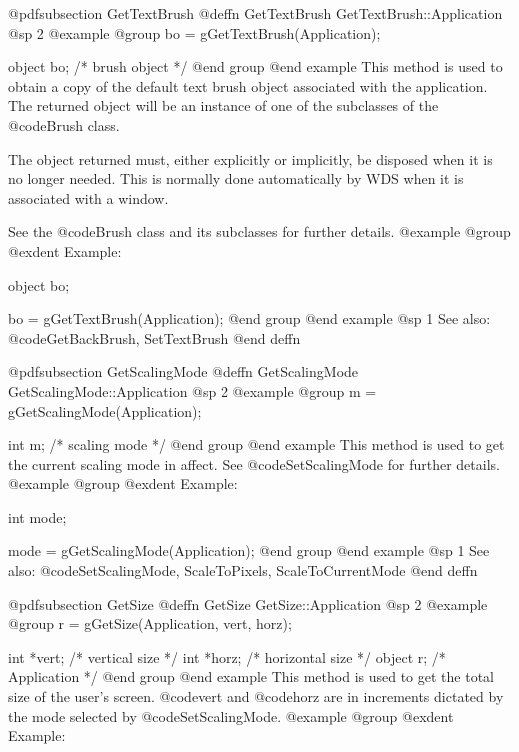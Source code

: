@pdfsubsection {GetTextBrush}
@deffn {GetTextBrush} GetTextBrush::Application
@sp 2
@example
@group
bo = gGetTextBrush(Application);

object  bo;     /*  brush object  */
@end group
@end example
This method is used to obtain a copy of the default text brush object
associated with the application.  The returned object will be an
instance of one of the subclasses of the @code{Brush} class.

The object returned must, either explicitly or implicitly, be
disposed when it is no longer needed.  This is normally done
automatically by WDS when it is associated with a window.

See the @code{Brush} class and its subclasses for further details.
@example
@group
@exdent Example:

object  bo;

bo = gGetTextBrush(Application);
@end group
@end example
@sp 1
See also:  @code{GetBackBrush, SetTextBrush}
@end deffn















@pdfsubsection {GetScalingMode}
@deffn {GetScalingMode} GetScalingMode::Application
@sp 2
@example
@group
m = gGetScalingMode(Application);

int     m;      /*  scaling mode   */
@end group
@end example
This method is used to get the current scaling mode in affect.
See @code{SetScalingMode} for further details.
@example
@group
@exdent Example:

int     mode;

mode = gGetScalingMode(Application);
@end group
@end example
@sp 1
See also:  @code{SetScalingMode, ScaleToPixels, ScaleToCurrentMode}
@end deffn
















@pdfsubsection {GetSize}
@deffn {GetSize} GetSize::Application
@sp 2
@example
@group
r = gGetSize(Application, vert, horz);

int    *vert;   /*  vertical size    */
int    *horz;   /*  horizontal size  */
object  r;      /*  Application      */
@end group
@end example
This method is used to get the total size of the user's screen.
@code{vert} and @code{horz} are in increments dictated by the
mode selected by @code{SetScalingMode}.  
@example
@group
@exdent Example:

